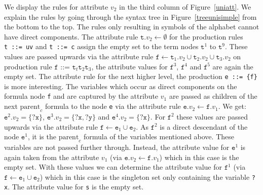 We display the rules for attribute $v_2$ in the third column of Figure~\ref{uniatt}. 
We explain the rules by going through the syntax tree in Figure~\ref{treeunisimple} from the bottom to the top. %
The rules only resulting in symbols of the alphabet cannot have direct components. %
The attribute rule $\texttt{t}.v_2\leftarrow \emptyset$ for the production rules \texttt{t~::=~uv} and \texttt{t~::=~c} assign the empty set to the term nodes
$\texttt{t}^1$ to $\texttt{t}^9$.
These values are passed upwards via the attribute rule $\texttt{f}\leftarrow \texttt{t}_1.v_2\cup \texttt{t}_2.v_2 \cup \texttt{t}_3.v_2$ 
on production rule $\texttt{f ::= t}_t \texttt{t}_2 \texttt{t}_3$, 
the attribute values for $\texttt{f}^3$, $\texttt{f}^4$ and $\texttt{f}^5$ are again the empty set.
The attribute rule for the next higher level, the production \texttt{e ::= \{f\}} is more interesting. 
The variables which occur as direct components on the formula node \texttt{f} and are captured by the attribute $v_1$
are passed as children of the next $\text{parent}_c$ formula to the node \texttt{e} via the attribute rule $\texttt{e}.v_2\leftarrow \texttt{f}.v_1$. We get: 
$\texttt{e}^2.v_2 =\{\texttt{?x}\}$,
$\texttt{e}^3.v_2 =\{\texttt{?x}, \texttt{?y}\}$ and
$\texttt{e}^4.v_2 =\{\texttt{?x}\}
$.
For $\texttt{f}^2$ these values are passed upwards via the attribute rule $\texttt{f}\leftarrow \texttt{e}_1 \cup \texttt{e}_2$.
As $\texttt{f}^2$ is a direct descendant  of the node $\texttt{e}^1$, it is the $\text{parent}_c$ formula of the variables mentioned above. 
These variables are not passed further through. Instead, the attribute value for $\texttt{e}^1$ is again taken from the attribute $v_1$
(via $\texttt{e}.v_2\leftarrow \texttt{f}.v_1$) which in this case is the empty set.
With these values we can determine the attribute value for $\texttt{f}^1$ (via $\texttt{f}\leftarrow \texttt{e}_1 \cup \texttt{e}_2$) which in this case is 
the singleton set only containing the variable \texttt{?x}.
The attribute value for \texttt{s} is the empty set. 

